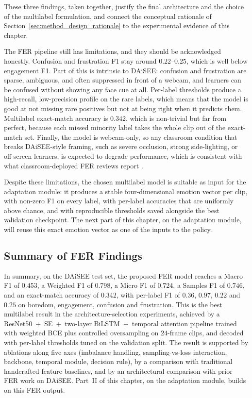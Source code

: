 These three findings, taken together, justify the final architecture and the choice of the multilabel formulation, and connect the conceptual rationale of Section~\ref{sec:method_design_rationale} to the experimental evidence of this chapter.

The FER pipeline still has limitations, and they should be acknowledged honestly. Confusion and frustration F1 stay around $0.22$--$0.25$, which is well below engagement F1. Part of this is intrinsic to DAiSEE: confusion and frustration are sparse, ambiguous, and often suppressed in front of a webcam, and learners can be confused without showing any face cue at all. Per-label thresholds produce a high-recall, low-precision profile on the rare labels, which means that the model is good at not missing rare positives but not at being right when it predicts them. Multilabel exact-match accuracy is $0.342$, which is non-trivial but far from perfect, because each missed minority label takes the whole clip out of the exact-match set. Finally, the model is webcam-only, so any classroom condition that breaks DAiSEE-style framing, such as severe occlusion, strong side-lighting, or off-screen learners, is expected to degrade performance, which is consistent with what classroom-deployed FER reviews report \cite{lek_academic_2023,florestiyanto_emotion_2024,vistorte_integrating_2024}.

Despite these limitations, the chosen multilabel model is suitable as input for the adaptation module: it produces a stable four-dimensional emotion vector per clip, with non-zero F1 on every label, with per-label accuracies that are uniformly above chance, and with reproducible thresholds saved alongside the best validation checkpoint. The next part of this chapter, on the adaptation module, will reuse this exact emotion vector as one of the inputs to the policy.

\subsection{Summary of FER Findings}\label{sec:results_fer_summary}

In summary, on the DAiSEE test set, the proposed FER model reaches a Macro F1 of $0.453$, a Weighted F1 of $0.798$, a Micro F1 of $0.724$, a Samples F1 of $0.746$, and an exact-match accuracy of $0.342$, with per-label F1 of $0.36$, $0.97$, $0.22$ and $0.25$ on boredom, engagement, confusion and frustration. This is the best multilabel result in the architecture-selection experiments, achieved by a ResNet50~+~SE~+~two-layer BiLSTM~+~temporal attention pipeline trained with weighted BCE plus controlled oversampling on $24$-frame clips, and decoded with per-label thresholds tuned on the validation split. The result is supported by ablations along five axes (imbalance handling, sampling-vs-loss interaction, backbone, temporal module, decision rule), by a comparison with traditional handcrafted-feature baselines, and by an architectural comparison with prior FER work on DAiSEE. Part~II of this chapter, on the adaptation module, builds on this FER output.

